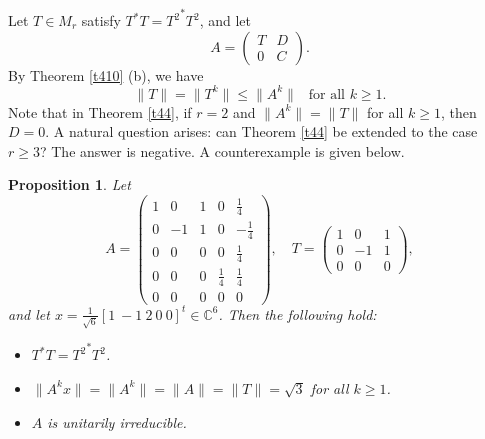 \documentclass[11pt]{article}
\newtheorem{proposition}[theorem]{Proposition}
\numberwithin{equation}{section}
\def\IC{{\mathbb C}}
\begin{document}
Let $T\in M_r$ satisfy $T^*T={T^2}^*T^2$, and let
\[
A=\begin{pmatrix}
T & D\\
0 & C
\end{pmatrix}.
\]
By Theorem \ref{t410} (b), we have
\[
\|T\|=\|T^k\|\le \|A^k\| \ \ \mbox{ for all } k\ge 1.
\]
Note that in Theorem \ref{t44}, if $r=2$ and $\|A^k\|=\|T\|$ for all $k\ge 1$, then $D=0$. A natural question arises: can Theorem \ref{t44} be extended to the case $r\ge 3$? The answer is negative. A counterexample is given below.

\begin{proposition}\label{prop49}
Let
\[
A=\begin{pmatrix}
1&  0&  1&  0& \frac{1}{4}\\
0&  -1&  1&  0& -\frac{1}{4}\\
0&  0&  0&  0& \frac{1}{4}\\
0&  0&  0&  \frac{1}{4}& \frac{1}{4}\\
0&  0&  0&  0& 0
\end{pmatrix},\quad
T=\begin{pmatrix}
1&  0& 1\\
0&  -1& 1\\
0&  0& 0
\end{pmatrix},
\]
and let $x=\frac{1}{\sqrt{6}}[1 \ -1 \ 2 \ 0 \ 0]^t\in\IC^6$. Then the following hold:
\begin{itemize}
  \item[\rm (a)] $T^*T={T^2}^*T^2$.
  \item[\rm (b)] $\|A^k x\|=\|A^k\|=\|A\|=\|T\|=\sqrt{3}$ for all $k\ge 1$.
  \item[\rm (c)] $A$ is unitarily irreducible.
\end{itemize}
\end{proposition}
\end{document}
